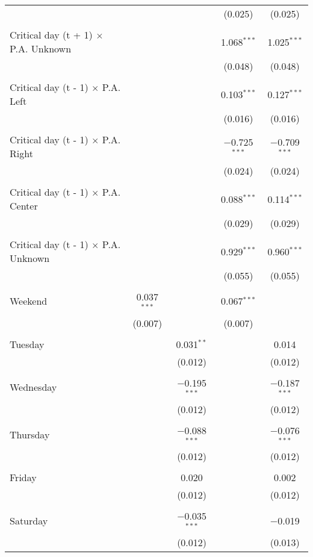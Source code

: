\documentclass[
]{article}
\begin{document}
\begin{table}[!htbp]
{\begin{tabular}{@{\extracolsep{5pt}}lcccc}
  &  &  & (0.025) & (0.025) \\ 
  & & & & \\ 
 Critical day (t + 1) $\times$ P.A. Unknown &  &  & 1.068$^{***}$ & 1.025$^{***}$ \\ 
  &  &  & (0.048) & (0.048) \\ 
  & & & & \\ 
 Critical day (t - 1) $\times$ P.A. Left &  &  & 0.103$^{***}$ & 0.127$^{***}$ \\ 
  &  &  & (0.016) & (0.016) \\ 
  & & & & \\ 
 Critical day (t - 1) $\times$ P.A. Right &  &  & $-$0.725$^{***}$ & $-$0.709$^{***}$ \\ 
  &  &  & (0.024) & (0.024) \\ 
  & & & & \\ 
 Critical day (t - 1) $\times$ P.A. Center &  &  & 0.088$^{***}$ & 0.114$^{***}$ \\ 
  &  &  & (0.029) & (0.029) \\ 
  & & & & \\ 
 Critical day (t - 1) $\times$ P.A. Unknown &  &  & 0.929$^{***}$ & 0.960$^{***}$ \\ 
  &  &  & (0.055) & (0.055) \\ 
  & & & & \\ 
 Weekend & 0.037$^{***}$ &  & 0.067$^{***}$ &  \\ 
  & (0.007) &  & (0.007) &  \\ 
  & & & & \\ 
 Tuesday &  & 0.031$^{**}$ &  & 0.014 \\ 
  &  & (0.012) &  & (0.012) \\ 
  & & & & \\ 
 Wednesday &  & $-$0.195$^{***}$ &  & $-$0.187$^{***}$ \\ 
  &  & (0.012) &  & (0.012) \\ 
  & & & & \\ 
 Thursday &  & $-$0.088$^{***}$ &  & $-$0.076$^{***}$ \\ 
  &  & (0.012) &  & (0.012) \\ 
  & & & & \\ 
 Friday &  & 0.020 &  & 0.002 \\ 
  &  & (0.012) &  & (0.012) \\ 
  & & & & \\ 
 Saturday &  & $-$0.035$^{***}$ &  & $-$0.019 \\ 
  &  & (0.012) &  & (0.013) \\ 

\end{tabular}}
\end{table}
\end{document}
